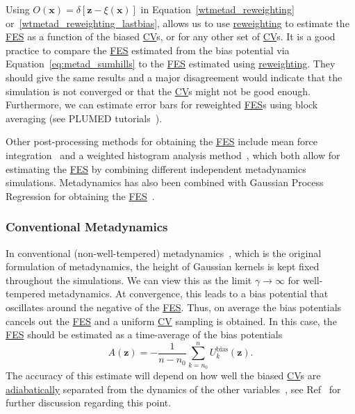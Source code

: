 \documentclass[9pt,review]{livecoms}
\newcommand{\vx}{\mathbf{x}}
\newcommand{\vz}{\mathbf{z}}
\begin{document}
Using $O(\vx) = \delta[\vz-\xi(\vx)]$ in Equation~\ref{wtmetad_reweighting} or~\ref{wtmetad_reweighting_lastbias}, allows us to use \hyperlink{ref:Reweighting} {reweighting} to estimate the \hyperlink{ref:FES} {FES} as a function of the biased \hyperlink{ref:CV} {CV}s, or for any other set of \hyperlink{ref:CV} {CV}s. It is a good practice to compare the \hyperlink{ref:FES} {FES} estimated from the bias potential via Equation~\ref{eq:metad_sumhills} to the \hyperlink{ref:FES} {FES} estimated using \hyperlink{ref:Reweighting} {reweighting}. They should give the same results and a major disagreement would indicate that the simulation is not converged or that the \hyperlink{ref:CV} {CV}s might not be good enough. Furthermore, we can estimate error bars for reweighted \hyperlink{ref:FES} {FES}s using block averaging (see PLUMED tutorials~\cite{plumed_masterclass}).

Other post-processing methods for obtaining the \hyperlink{ref:FES} {FES} include mean force integration~\cite{10.1063/1.5123498} and a weighted histogram analysis method~\cite{10.1016/j.cplett.2020.137384}, which both allow for estimating the \hyperlink{ref:FES} {FES} by combining different independent metadynamics simulations. Metadynamics has also been combined with Gaussian Process Regression for obtaining the \hyperlink{ref:FES} {FES}~\cite{Mones2016}.


\subsubsection{Conventional Metadynamics}
\label{sec:meta-classic}

In conventional (non-well-tempered) metadynamics~\cite{Laio-PNAS-2002}, which is the original formulation of metadynamics, the height of Gaussian kernels is kept fixed throughout the simulations. We can view this as the limit $
\gamma \to \infty$ for well-tempered metadynamics. At convergence, this leads to a bias potential that oscillates around the negative of the \hyperlink{ref:FES} {FES}. Thus, on average the bias potentials cancels out the \hyperlink{ref:FES} {FES} and a uniform \hyperlink{ref:CV} {CV} sampling is obtained. In this case, the \hyperlink{ref:FES} {FES} should be estimated as a time-average of the bias potentials~\cite{BussiLaio_ReviewMetaD_2020}
\begin{equation}
A(\vz) = - \frac{1}{n-n_0} \sum^{n}_{k=n_0} U^{\mathrm{bias}}_k(\vz).
\end{equation}
The accuracy of this estimate will depend on how well the biased \hyperlink{ref:CV} {CV}s are \hyperlink{ref:AdiabaticDyn} {adiabatically} separated from the dynamics of the other variables~\cite{laio-gervasio-08,jourdain-lelievre-zitt-21}, see Ref~\cite{BussiLaio_ReviewMetaD_2020} for further discussion regarding this point.
\end{document}
